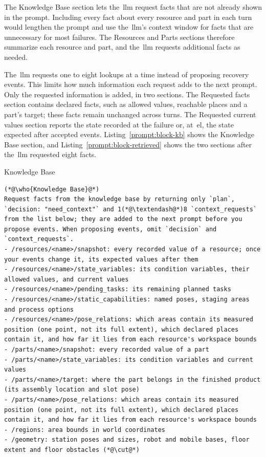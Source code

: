 The Knowledge Base section lets the~\gls{llm} request facts that are not already shown in the prompt.
Including every fact about every resource and part in each turn would lengthen the prompt and
use the~\gls{llm}'s context window for facts that are unnecessary for most failures. The Resources and
Parts sections therefore summarize each resource and part, and the~\gls{llm} requests additional facts
as needed.

The~\gls{llm} requests one to eight lookups at a time instead of proposing recovery events. This limits
how much information each request adds to the next prompt. Only the requested information is
added, in two sections. The Requested facts section contains declared facts, such as allowed
values, reachable places and a part's target; these facts remain unchanged across turns. The
Requested current values section reports the state recorded at the failure or, at~\gls{el}, the state expected after accepted events. Listing~\ref{prompt:block-kb} shows the Knowledge Base
section, and Listing~\ref{prompt:block-retrieved} shows the two sections after the~\gls{llm} requested eight facts.

\begin{recbox}{Knowledge Base}
\begin{lstlisting}
(*@\who{Knowledge Base}@*)
Request facts from the knowledge base by returning only `plan`, `decision: "need_context"` and 1(*@\textendash@*)8 `context_requests` from the list below; they are added to the next prompt before you propose events. When proposing events, omit `decision` and `context_requests`.
- /resources/<name>/snapshot: every recorded value of a resource; once your events change it, its expected values after them
- /resources/<name>/state_variables: its condition variables, their allowed values, and current values
- /resources/<name>/pending_tasks: its remaining planned tasks
- /resources/<name>/static_capabilities: named poses, staging areas and process options
- /resources/<name>/pose_relations: which areas contain its measured position (one point, not its full extent), which declared places contain it, and how far it lies from each resource's workspace bounds
- /parts/<name>/snapshot: every recorded value of a part
- /parts/<name>/state_variables: its condition variables and current values
- /parts/<name>/target: where the part belongs in the finished product (its assembly location and slot pose)
- /parts/<name>/pose_relations: which areas contain its measured position (one point, not its full extent), which declared places contain it, and how far it lies from each resource's workspace bounds
- /regions: area bounds in world coordinates
- /geometry: station poses and sizes, robot and mobile bases, floor extent and floor obstacles (*@\cut@*)
\end{lstlisting}
\end{recbox}

